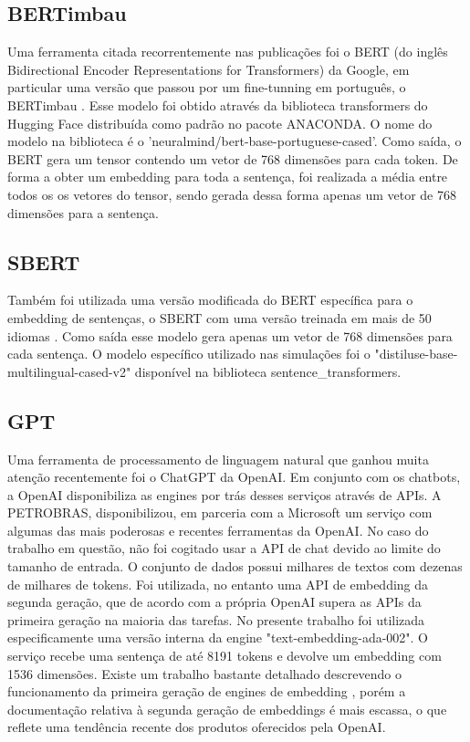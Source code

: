 \documentclass[conference]{IEEEtran}
\begin{document}
\subsection{BERTimbau}

  Uma ferramenta citada recorrentemente nas publicações foi o BERT (do inglês Bidirectional Encoder Representations for Transformers) da Google, em particular uma versão que passou por um fine-tunning em português, o BERTimbau \cite{souza2020bertimbau}. Esse modelo foi obtido através da biblioteca transformers do Hugging Face distribuída como padrão no pacote ANACONDA. O nome do modelo na biblioteca é o 'neuralmind/bert-base-portuguese-cased'. Como saída, o BERT gera um tensor contendo um vetor de 768 dimensões para cada token. De forma a obter um embedding para toda a sentença, foi realizada a média entre todos os os vetores do tensor, sendo gerada dessa forma apenas um vetor de 768 dimensões para a sentença. 

\subsection{SBERT}

  Também foi utilizada uma versão modificada do BERT específica para o embedding de sentenças, o SBERT \cite{reimers-2019-sentence-bert} com uma versão treinada em mais de 50 idiomas \cite{reimers-2020-multilingual-sentence-bert}. Como saída esse modelo gera apenas um vetor de 768 dimensões para cada sentença. O modelo específico utilizado nas simulações foi o "distiluse-base-multilingual-cased-v2" disponível na biblioteca sentence\_transformers.

\subsection{GPT}

  Uma ferramenta de processamento de linguagem natural que ganhou muita atenção recentemente foi o ChatGPT da OpenAI. Em conjunto com os chatbots, a OpenAI disponibiliza as engines por trás desses serviços através de APIs. A PETROBRAS, disponibilizou, em parceria com a Microsoft um serviço com algumas das mais poderosas e recentes ferramentas da OpenAI. No caso do trabalho em questão, não foi cogitado usar a API de chat devido ao limite do tamanho de entrada. O conjunto de dados possui milhares de textos com dezenas de milhares de tokens. Foi utilizada, no entanto uma API de embedding da segunda geração, que de acordo com a própria OpenAI supera as APIs da primeira geração na maioria das tarefas. No presente trabalho foi utilizada especificamente uma versão interna da engine "text-embedding-ada-002". O serviço recebe uma sentença de até 8191 tokens e devolve um embedding com 1536 dimensões. Existe um trabalho bastante detalhado descrevendo o funcionamento da primeira geração de engines de embedding \cite{neelakantan2022text}, porém a documentação relativa à segunda geração de embeddings é mais escassa, o que reflete uma tendência recente dos produtos oferecidos pela OpenAI. 
\end{document}
